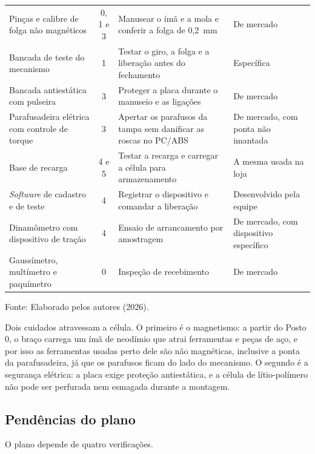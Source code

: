 {\begin{longtable}{@{}>{\raggedright\arraybackslash}p{4.2cm} c >{\raggedright\arraybackslash}p{4.4cm} >{\raggedright\arraybackslash}p{2.9cm}@{}}
Pinças e calibre de folga não magnéticos & 0, 1 e 3 & Manusear o ímã e a mola e conferir a folga de 0,2~mm & De mercado \\
Bancada de teste do mecanismo & 1 & Testar o giro, a folga e a liberação antes do fechamento & Específica \\
Bancada antiestática com pulseira & 3 & Proteger a placa durante o manuseio e as ligações & De mercado \\
Parafusadeira elétrica com controle de torque & 3 & Apertar os parafusos da tampa sem danificar as roscas no PC/ABS & De mercado, com ponta não imantada \\
Base de recarga & 4 e 5 & Testar a recarga e carregar a célula para armazenamento & A mesma usada na loja \\
\textit{Software} de cadastro e de teste & 4 & Registrar o dispositivo e comandar a liberação & Desenvolvido pela equipe \\
Dinamômetro com dispositivo de tração & 4 & Ensaio de arrancamento por amostragem & De mercado, com dispositivo específico \\
Gaussímetro, multímetro e paquímetro & 0 & Inspeção de recebimento & De mercado \\
\end{longtable}
}
\begin{center}
Fonte: Elaborado pelos autores (2026).
\end{center}

Dois cuidados atravessam a célula. O primeiro é o magnetismo: a partir do Posto 0, o braço carrega um ímã de neodímio que atrai ferramentas e peças de aço, e por isso as ferramentas usadas perto dele são não magnéticas, inclusive a ponta da parafusadeira, já que os parafusos ficam do lado do mecanismo. O segundo é a segurança elétrica: a placa exige proteção antiestática, e a célula de lítio-polímero não pode ser perfurada nem esmagada durante a montagem.

\subsection{Pendências do plano}
\label{subsec:plano_pendencias}

O plano depende de quatro verificações.

